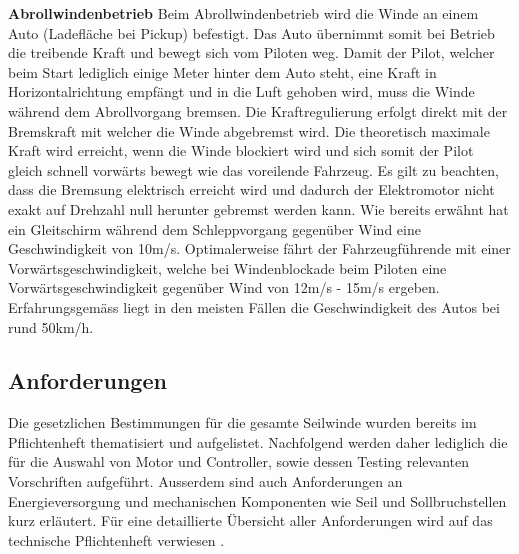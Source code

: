 \textbf{Abrollwindenbetrieb}
Beim Abrollwindenbetrieb wird die Winde an einem Auto (Ladefläche bei Pickup) befestigt. Das Auto übernimmt somit bei Betrieb die treibende Kraft und bewegt sich vom Piloten weg. Damit der Pilot, welcher beim Start lediglich einige Meter hinter dem Auto steht, eine Kraft in Horizontalrichtung empfängt und in die Luft gehoben wird, muss die Winde während dem Abrollvorgang bremsen. Die Kraftregulierung erfolgt direkt mit der Bremskraft mit welcher die Winde abgebremst wird. Die theoretisch maximale Kraft wird erreicht, wenn die Winde blockiert wird und sich somit der Pilot gleich schnell vorwärts bewegt wie das voreilende Fahrzeug. Es gilt zu beachten, dass die Bremsung elektrisch erreicht wird und dadurch der Elektromotor nicht exakt auf Drehzahl null herunter gebremst werden kann. Wie bereits erwähnt hat ein Gleitschirm während dem Schleppvorgang gegenüber Wind eine Geschwindigkeit von 10m/s. Optimalerweise fährt der Fahrzeugführende mit einer Vorwärtsgeschwindigkeit, welche bei Windenblockade beim Piloten eine Vorwärtsgeschwindigkeit gegenüber Wind von 12m/s - 15m/s ergeben. Erfahrungsgemäss liegt in den meisten Fällen die Geschwindigkeit des Autos bei rund 50km/h.


\subsection{Anforderungen}\label{subsec:Richtlinien}
Die gesetzlichen Bestimmungen für die gesamte Seilwinde wurden bereits im Pflichtenheft thematisiert und aufgelistet. Nachfolgend werden daher lediglich die für die Auswahl von Motor und Controller, sowie dessen Testing relevanten Vorschriften aufgeführt. Ausserdem sind auch Anforderungen an Energieversorgung und mechanischen Komponenten wie Seil und Sollbruchstellen kurz erläutert. Für eine detaillierte Übersicht aller Anforderungen wird auf das technische Pflichtenheft verwiesen \cite{TechPflichtenheft}.

